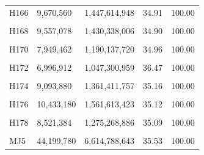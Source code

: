 \documentclass[
  a4paper,
  titlepage]{article}
\begin{document}
\begin{longtable}[t]{lllll}
H166 & 9,670,560 & 1,447,614,948 & 34.91 & 100.00\\
 
\cellcolor{gray!6}{H167} & \cellcolor{gray!6}{8,968,558} & \cellcolor{gray!6}{1,342,483,242} & \cellcolor{gray!6}{36.43} & \cellcolor{gray!6}{100.00}\\
 
H168 & 9,557,078 & 1,430,338,006 & 34.90 & 100.00\\
 
\cellcolor{gray!6}{H169} & \cellcolor{gray!6}{7,988,952} & \cellcolor{gray!6}{1,195,452,507} & \cellcolor{gray!6}{34.58} & \cellcolor{gray!6}{100.00}\\
 
H170 & 7,949,462 & 1,190,137,720 & 34.96 & 100.00\\
 
\cellcolor{gray!6}{H171} & \cellcolor{gray!6}{10,696,708} & \cellcolor{gray!6}{1,601,197,622} & \cellcolor{gray!6}{34.95} & \cellcolor{gray!6}{100.00}\\
 
H172 & 6,996,912 & 1,047,300,959 & 36.47 & 100.00\\
 
\cellcolor{gray!6}{H173} & \cellcolor{gray!6}{7,294,958} & \cellcolor{gray!6}{1,091,743,854} & \cellcolor{gray!6}{35.19} & \cellcolor{gray!6}{100.00}\\
 
H174 & 9,093,880 & 1,361,411,757 & 35.16 & 100.00\\
 
\cellcolor{gray!6}{H175} & \cellcolor{gray!6}{8,086,392} & \cellcolor{gray!6}{1,210,539,765} & \cellcolor{gray!6}{34.42} & \cellcolor{gray!6}{100.00}\\
 
H176 & 10,433,180 & 1,561,613,423 & 35.12 & 100.00\\
 
\cellcolor{gray!6}{H177} & \cellcolor{gray!6}{7,245,758} & \cellcolor{gray!6}{1,084,255,028} & \cellcolor{gray!6}{34.23} & \cellcolor{gray!6}{100.00}\\
 
H178 & 8,521,384 & 1,275,268,886 & 35.09 & 100.00\\
 
\cellcolor{gray!6}{H179} & \cellcolor{gray!6}{7,407,594} & \cellcolor{gray!6}{1,108,637,615} & \cellcolor{gray!6}{34.90} & \cellcolor{gray!6}{100.00}\\
 
MJ5 & 44,199,780 & 6,614,788,643 & 35.53 & 100.00\\*
\end{longtable}
\end{document}
